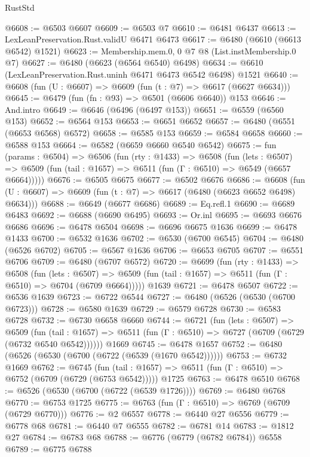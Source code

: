 \begin{lexlean}{RustStd}
\begin{coremodule}
@6608 := @6503 @6607
@6609 := @6503 @7
@6610 := @6481 @6437
@6613 := LexLeanPreservation.Rust.validU @6471 @6473
@6617 := @6480 (@6610 (@6613 @6542) @1521)
@6623 := Membership.mem.{0, 0} @7 @8 (List.instMembership.{0} @7)
@6627 := @6480 (@6623 (@6564 @6540) @6498)
@6634 := @6610 (LexLeanPreservation.Rust.uninh @6471 @6473 @6542 @6498) @1521
@6640 := @6608 (fun (U : @6607) => @6609 (fun (t : @7) => @6617 (@6627 @6634)))
@6645 := @6479 (fun (fn : @93) => @6501 (@6606 @6640)) @153
@6646 := And.intro
@6649 := @6646 (@6496 (@6497 @153))
@6651 := @6559 (@6560 @153)
@6652 := @6564 @153
@6653 := @6651 @6652
@6657 := @6480 (@6551 (@6653 @6568) @6572)
@6658 := @6585 @153
@6659 := @6584 @6658
@6660 := @6588 @153
@6664 := @6582 (@6659 @6660 @6540 @6542)
@6675 := fun (params : @6504) =>
  @6506
    (fun (rty : @1433) =>
    @6508
      (fun (lets : @6507) =>
      @6509 (fun (tail : @1657) => @6511 (fun (Γ : @6510) => @6549 (@6657 @6664)))))
@6676 := @6505 @6675
@6677 := @6502 @6676
@6686 := @6608 (fun (U : @6607) => @6609 (fun (t : @7) => @6617 (@6480 (@6623 @6652 @6498) @6634)))
@6688 := @6649 (@6677 @6686)
@6689 := Eq.refl.{1}
@6690 := @6689 @6483
@6692 := @6688 (@6690 @6495)
@6693 := Or.inl
@6695 := @6693 @6676 @6686
@6696 := @6478 @6504
@6698 := @6696 @6675 @1636
@6699 := @6478 @1433
@6700 := @6532 @1636
@6702 := @6530 (@6700 @6545)
@6704 := @6480 (@6526 @6702)
@6705 := @6567 @1636
@6706 := @6653 @6705
@6707 := @6551 @6706
@6709 := @6480 (@6707 @6572)
@6720 := @6699
    (fun (rty : @1433) =>
    @6508
      (fun (lets : @6507) =>
      @6509 (fun (tail : @1657) => @6511 (fun (Γ : @6510) => @6704 (@6709 @6664)))))
    @1639
@6721 := @6478 @6507
@6722 := @6536 @1639
@6723 := @6722 @6544
@6727 := @6480 (@6526 (@6530 (@6700 @6723)))
@6728 := @6580 @1639
@6729 := @6579 @6728
@6730 := @6583 @6728
@6732 := @6730 @6658 @6660
@6744 := @6721
    (fun (lets : @6507) =>
    @6509
      (fun (tail : @1657) => @6511 (fun (Γ : @6510) => @6727 (@6709 (@6729 (@6732 @6540 @6542))))))
    @1669
@6745 := @6478 @1657
@6752 := @6480 (@6526 (@6530 (@6700 (@6722 (@6539 (@1670 @6542))))))
@6753 := @6732 @1669
@6762 := @6745
    (fun (tail : @1657) => @6511 (fun (Γ : @6510) => @6752 (@6709 (@6729 (@6753 @6542)))))
    @1725
@6763 := @6478 @6510
@6768 := @6526 (@6530 (@6700 (@6722 (@6539 @1726))))
@6769 := @6480 @6768
@6770 := @6753 @1725
@6775 := @6763 (fun (Γ : @6510) => @6769 (@6709 (@6729 @6770)))
@6776 := @2 @6557
@6778 := @6440 @27 @6556
@6779 := @6778 @68
@6781 := @6440 @7 @6555
@6782 := @6781 @14
@6783 := @1812 @27
@6784 := @6783 @68
@6788 := @6776 (@6779 (@6782 @6784)) @6558
@6789 := @6775 @6788

\end{coremodule}
\end{lexlean}
